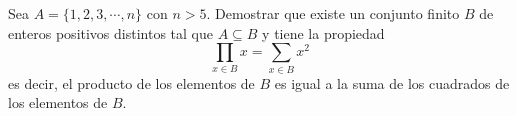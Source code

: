 Sea $A = \{ 1,2,3, \cdots ,n\}$ con $n>5$. Demostrar que existe un conjunto finito $B$ de enteros positivos distintos tal que $A \subseteq B$ y tiene la propiedad
\[ \prod_{x \in B} x = \sum_{x \in B} x^2 \]
es decir, el producto de los elementos de $B$ es igual a la suma de los cuadrados de los elementos de $B$.
